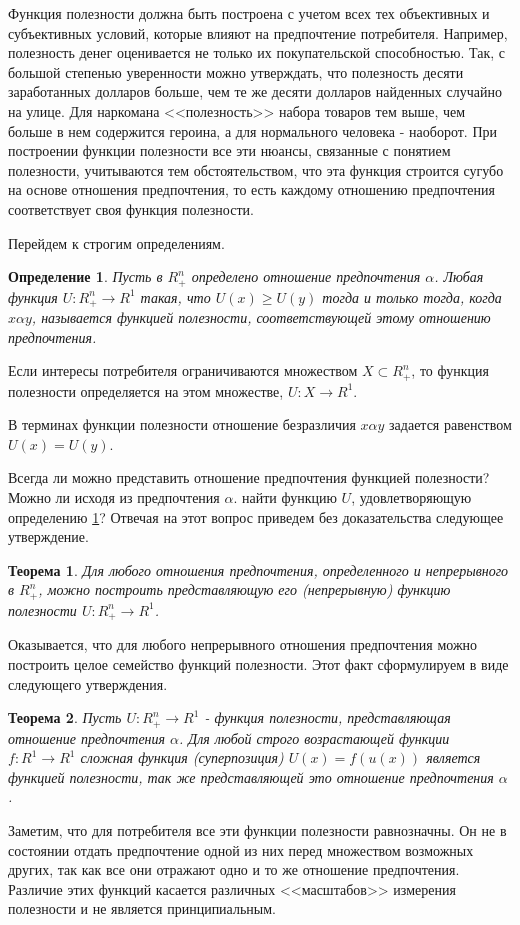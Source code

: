 \documentclass[12pt, 4paper]{book}
\newtheorem{theorem}{\indent \color{blue} Теорема}[chapter]
\newtheorem{definition}{\indent \color{blue} Определение}[chapter]
\begin{document}
{Функция полезности должна быть построена с учетом всех тех объективных и субъективных условий, которые влияют на предпочтение потребителя. Например, полезность денег оценивается не только их покупательской способностью. Так, с большой степенью уверенности можно утверждать, что полезность десяти заработанных долларов больше, чем те же десяти долларов найденных случайно на улице. Для наркомана <<полезность>> набора товаров тем выше, чем больше в нем содержится героина, а для нормального человека - наоборот. При построении функции полезности все эти нюансы, связанные с понятием полезности, учитываются тем обстоятельством, что эта функция строится сугубо на основе отношения предпочтения, то есть каждому отношению предпочтения соответствует своя функция полезности.

Перейдем к строгим определениям.
\begin{definition}
\label{def2.1}
\rm Пусть в $R_{+}^{n}$ определено отношение предпочтения $\alpha$. Любая функция $U:R_{+}^{n}\rightarrow R^{1}$ такая, что $U(x)\geq U(y)$ тогда и только тогда, когда $x \alpha y$, называется функцией полезности, соответствующей этому отношению предпочтения.
\end{definition}

Если интересы потребителя ограничиваются множеством $X \subset R_{+}^{n}$, то функция полезности определяется на этом множестве, $U:X\rightarrow R^{1}$.

В терминах функции полезности отношение безразличия $x \alpha y$ задается равенством $ U(x) = U(y)$.

Всегда ли можно представить отношение предпочтения функцией полезности? Можно ли исходя из предпочтения $\alpha$. найти функцию $U$, удовлетворяющую определению \ref{def2.1}? Отвечая на этот вопрос приведем без доказательства следующее утверждение.

\begin{theorem}
\label{theorem2.1}
\rm Для любого отношения предпочтения, определенного и непрерывного в $R_{+}^{n}$, можно построить представляющую его (непрерывную) функцию
полезности $U:R_{+}^{n}\rightarrow R^{1}$.
\end{theorem}
Оказывается, что для любого непрерывного отношения предпочтения можно построить целое семейство функций полезности. Этот факт сформулируем в виде следующего утверждения.
\begin{theorem}
\label{theorem2.2}
\rm Пусть $U:R_{+}^{n}\rightarrow R^{1}$ - функция полезности, представляющая отношение предпочтения $\alpha$. Для любой строго возрастающей функции $f:R^{1}\rightarrow R^{1}$ сложная функция (суперпозиция) $U(x) = f(u(x))$ является функцией полезности, так же представляющей это отношение предпочтения $\alpha$.
\end{theorem}
\par
Заметим, что для потребителя все эти функции полезности равнозначны. Он не в состоянии отдать предпочтение одной из них перед множеством возможных других, так как все они отражают одно и то же отношение предпочтения. Различие этих функций касается различных <<масштабов>> измерения полезности и не является принципиальным. 

}
\end{document}

